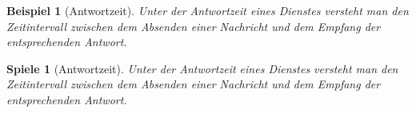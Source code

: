 \documentclass[a4paper,12pt]{scrreprt}
\newtheorem{mdbeispiel}{Beispiel}[section]
\newtheorem{mdspiele}{Spiele}[section]
\newenvironment{beispiel}[1][]%
		{\begin{mdframed}[linecolor=blue]\begin{mdbeispiel}[#1]}
		{\end{mdbeispiel}\end{mdframed}}
\newenvironment{spiele}[1][]%
		{\begin{mdframed}[linecolor=red]\begin{mdspiele}[#1]}
		{\end{mdspiele}\end{mdframed}}
\begin{document}
\begin{beispiel}[Antwortzeit]
	Unter der Antwortzeit eines Dienstes versteht man den Zeitintervall zwischen dem
	Absenden einer Nachricht und dem Empfang der entsprechenden Antwort. 
\end{beispiel}

\begin{spiele}[Antwortzeit]
	Unter der Antwortzeit eines Dienstes versteht man den Zeitintervall zwischen dem
	Absenden einer Nachricht und dem Empfang der entsprechenden Antwort. 
\end{spiele}
\end{document}
